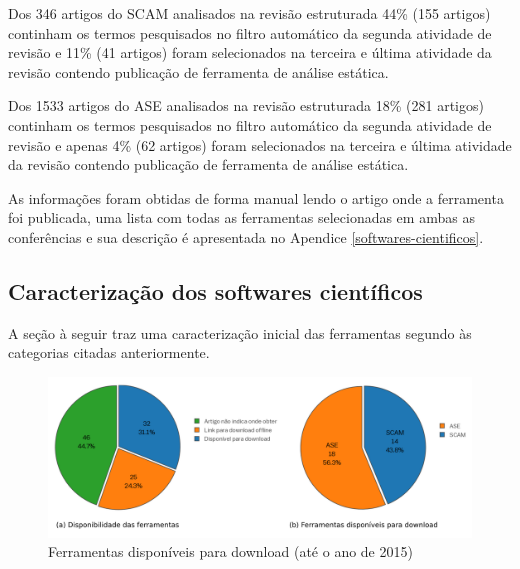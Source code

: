Dos 346 artigos do SCAM analisados na revisão estruturada 44\% (155 artigos)
continham os termos pesquisados no filtro automático da segunda atividade de
revisão e 11\% (41 artigos) foram selecionados na terceira e última atividade
da revisão contendo publicação de ferramenta de análise estática.

Dos 1533 artigos do ASE analisados na revisão estruturada 18\% (281 artigos)
continham os termos pesquisados no filtro automático da segunda atividade de
revisão e apenas 4\% (62 artigos) foram selecionados na terceira e última
atividade da revisão contendo publicação de ferramenta de análise estática.

As informações foram obtidas de forma manual lendo o artigo onde a ferramenta foi publicada,
uma lista com todas as ferramentas selecionadas em ambas as conferências e sua descrição
é apresentada no Apendice \ref{softwares-cientificos}.

\subsection{Caracterização dos softwares científicos}

A seção à seguir traz uma caracterização inicial das ferramentas segundo às
categorias citadas anteriormente.

\begin{figure}[h]
  \center
  \includegraphics[scale=0.85]{imagens/ferramentas-disponiveis.png}
  \caption{Ferramentas disponíveis para download (até o ano de 2015)}
  \label{ferramentas-disponiveis}
\end{figure}

